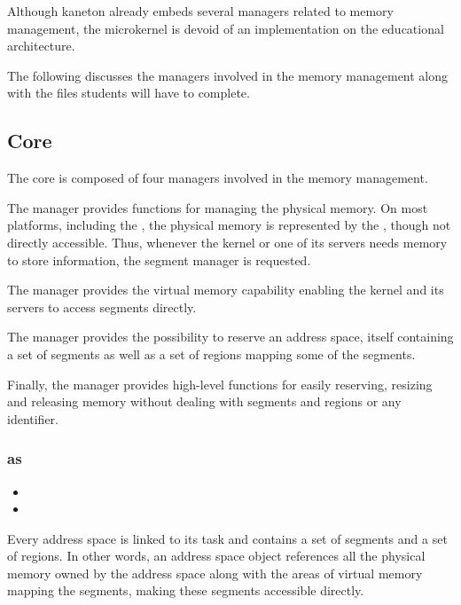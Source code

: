 Although kaneton already embeds several managers related to memory management,
the microkernel is devoid of an implementation on the  educational
architecture.

The following discusses the managers involved in the memory management
along with the files students will have to complete.

\subsection{Core}

The core is composed of four managers involved in the memory management.

The  manager provides functions for managing the physical memory.
On most platforms, including the , the physical memory is
represented by the , though not directly
accessible. Thus, whenever the kernel or one of its servers needs memory to
store information, the segment manager is requested.

The  manager provides the virtual memory capability enabling
the kernel and its servers to access segments directly.

The  manager provides the possibility to reserve an address space,
itself containing a set of segments as well as a set of regions mapping some of
the segments.

Finally, the  manager provides high-level functions for easily
reserving, resizing and releasing memory without dealing with segments and
regions or any identifier.

\subsubsection*{as}

\begin{itemize}
  \item
  \item
\end{itemize}

Every address space is linked to its task and contains a set of segments
and a set of regions. In other words, an address space object references all
the physical memory owned by the address space along with the areas of
virtual memory mapping the segments, making these segments accessible directly.

